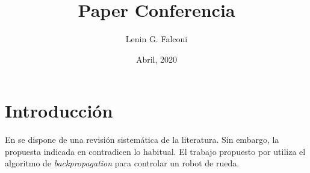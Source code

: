 \documentclass{article} %
\title{Paper        Conferencia}
\author{Lenin G. Falconi }
\date{Abril, 2020}
\begin{document}
\maketitle

\section{Introducción}
En \cite{nogueira2017image} se dispone de una revisión sistemática de la literatura. Sin embargo, la propuesta indicada en \cite{dawkins_biology_2016} contradicen lo habitual. El trabajo propuesto por \cite{priandana2018backprop} utiliza el algoritmo de \textit{backpropagation} para controlar un robot de rueda.

\printbibliography[title={Bibliografía}]
\end{document}
